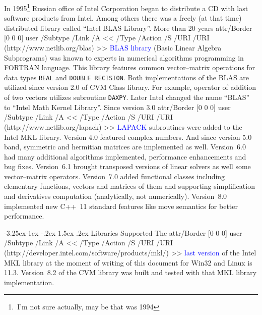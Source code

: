 \documentclass[12pt,letterpaper]{article}
\makeatletter
\newcommand{\URL}[2]{%
    \pdfstartlink attr{/Border [0 0 0]} user{%
    /Subtype /Link
    /A <<
        /Type /Action
        /S /URI
        /URI (#2)
    >>}%
\textcolor{blue}{#1}%
\pdfendlink}
\newcommand{\FORTRAN}{\textsf{FORTRAN}\xspace}
\newcommand{\CVMVERSION}{8.2\xspace}
\newcommand{\MKLVERSION}{11.3}
\renewcommand\subsection{\@startsection{subsection}{2}{0mm}%
                                     {-3.25ex\@plus -1ex \@minus -.2ex}%
                                     {1.5ex \@plus .2ex}%
                                     {\normalfont\large\bfseries\sffamily}}
\makeatother
\begin{document}
In 1995\footnote{\,I'm not sure actually, may be that was 1994}
Russian office of Intel Corporation began to distribute a CD with
last software products from Intel. Among others there was a freely
(at that time) distributed library called ``Intel BLAS Library''.
More than 20 years \URL{BLAS library}{http://www.netlib.org/blas}
(Basic Linear Algebra Subprograms) was known to experts in numerical
algorithms programming in \FORTRAN language. This library features
common vector--matrix operations for data types \verb"REAL" and
\verb"DOUBLE RECISION". 
Both implementations of the BLAS are utilized since version 2.0 of
CVM Class library. For example, operator of addition of two vectors
utilizes subroutine \verb"DAXPY". Later Intel changed the name
``BLAS'' to ``Intel Math Kernel Library''. Since version 3.0
\URL{LAPACK}{http://www.netlib.org/lapack} subroutines were
added to the Intel MKL library.
Version 4.0 featured complex numbers. And since version
5.0 band, symmetric and hermitian matrices are implemented as well.
Version~6.0 had many additional algorithms implemented, performance 
enhancements and bug fixes. Version~6.1 brought transposed versions of 
linear solvers as well some vec\-tor--matrix operators.
Version~7.0 added functional classes including elementary functions,
vectors and matrices of them and supporting simplification and
derivatives computation (analytically, not numerically).
Version~8.0 implemented new C++~11 standard features like move semantics 
for better performance.

\subsection{Libraries Supported}
The
\URL{last version}{http://developer.intel.com/software/products/mkl/} of the
Intel MKL library at the moment of writing of this document for Win32 and
Linux is \MKLVERSION. Version~\CVMVERSION of the CVM library was 
built and tested with that MKL library implementation.

\end{document}
